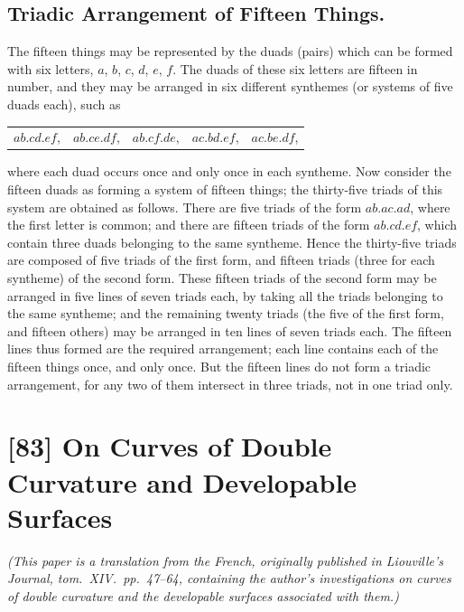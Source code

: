 \documentclass[12pt,a4paper]{article}
\begin{document}
\subsection*{Triadic Arrangement of Fifteen Things.}

The fifteen things may be represented by the duads (pairs) which can be formed with six letters, $a$, $b$, $c$, $d$, $e$, $f$. The duads of these six letters are fifteen in number, and they may be arranged in six different synthemes (or systems of five duads each), such as
\begin{center}
\begin{tabular}{lllll}
$ab.cd.ef$, & $ab.ce.df$, & $ab.cf.de$, & $ac.bd.ef$, & $ac.be.df$,
\end{tabular}
\end{center}
where each duad occurs once and only once in each syntheme. Now consider the fifteen duads as forming a system of fifteen things; the thirty-five triads of this system are obtained as follows. There are five triads of the form $ab.ac.ad$, where the first letter is common; and there are fifteen triads of the form $ab.cd.ef$, which contain three duads belonging to the same syntheme. Hence the thirty-five triads are composed of five triads of the first form, and fifteen triads (three for each syntheme) of the second form. These fifteen triads of the second form may be arranged in five lines of seven triads each, by taking all the triads belonging to the same syntheme; and the remaining twenty triads (the five of the first form, and fifteen others) may be arranged in ten lines of seven triads each. The fifteen lines thus formed are the required arrangement; each line contains each of the fifteen things once, and only once. But the fifteen lines do not form a triadic arrangement, for any two of them intersect in three triads, not in one triad only.

\newpage
\section*{[83] On Curves of Double Curvature and Developable Surfaces}

\bigskip

\noindent\textit{(This paper is a translation from the French, originally published in Liouville's Journal, tom.~XIV.\ pp.~47--64, containing the author's investigations on curves of double curvature and the developable surfaces associated with them.)}
\end{document}
